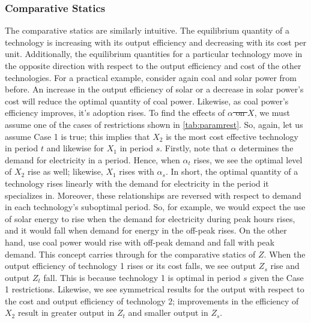 \documentclass[11pt,a4paper,leqno]{extarticle}
\providecommand{\DIFadd}[1]{{\protect\color{blue}\uwave{#1}}} %
\providecommand{\DIFdel}[1]{{\protect\color{red}\sout{#1}}}                      %
\providecommand{\DIFaddbegin}{} %
\providecommand{\DIFaddend}{} %
\providecommand{\DIFdelbegin}{} %
\providecommand{\DIFdelend}{} %
\begin{document}

\subsubsection{Comparative Statics}


The comparative statics are similarly intuitive. The equilibrium quantity of a technology is increasing with its output efficiency and decreasing with its cost per unit. Additionally, the equilibrium quantities for a particular technology move in the opposite direction with respect to the output efficiency and cost of the other technologies. For a practical example, consider again coal and solar power from before. An increase in the output efficiency of solar or a decrease in solar power's cost will reduce the optimal quantity of coal power. Likewise, as coal power's efficiency improves, it's adoption rises. To find the effects of \DIFdelbegin \DIFdel{$\alpha$ on $X$}\DIFdelend \DIFaddbegin \DIFadd{$\boldsymbol{\alpha}$ on $\mathbf{X}$}\DIFaddend , we must assume one of the cases of restrictions shown in  \autoref{tab:paramrest}. So, again, let us assume Case 1 is true; this implies that $X_2$ is the most cost effective technology in period $t$ and likewise for $X_1$ in period $s$. Firstly, note that \DIFdelbegin \DIFdel{$\alpha$ }\DIFdelend \DIFaddbegin \DIFadd{$\boldsymbol{\alpha}$ }\DIFaddend determines the demand for electricity in a period. Hence, when $\alpha_t$ rises, we see the optimal level of $X_2$ rise as well; likewise, $X_1$ rises with $\alpha_s$. In short, the optimal quantity of a technology rises linearly with the demand for electricity in the period it specializes in. Moreover, these relationships are reversed with respect to demand in each technology's suboptimal period. So, for example, we would expect the use of solar energy to rise when the demand for electricity during peak hours rises, and it would fall when demand for energy in the off-peak rises. On the other hand, use coal power would rise with off-peak demand and fall with peak demand. This concept carries through for the comparative statics of \DIFdelbegin \DIFdel{$Z$}\DIFdelend \DIFaddbegin \DIFadd{$\mathbf{Z}$}\DIFaddend . When the output efficiency of technology 1 rises or its cost falls, we see output $Z_s$ rise and output $Z_t$ fall. This is because technology 1 is optimal in period $s$ given the Case 1 restrictions. Likewise, we see symmetrical results for the output with respect to the cost and output efficiency of technology 2; improvements in the efficiency of $X_2$ result in greater output in $Z_t$ and smaller output in $Z_s$.  \DIFaddbegin \DIFadd{In total, we have Proposition 1:
}\DIFaddend 
\end{document}
